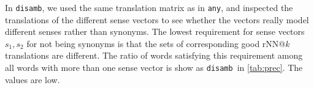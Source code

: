 \documentclass[11pt]{article}
\newcommand{\any}{\texttt{any}}
\newcommand{\disamb}{\texttt{disamb}}
\begin{document}
In \disamb, we used the same translation matrix as in \any, and inspected the
translations of the different sense vectors to see whether the vectors really
model different senses rather than synonyms.
The lowest requirement for sense vectors $s_1, s_2$ for not being synonyms is
that the sets of corresponding good rNN@$k$ translations are different. The
ratio of words satisfying this requirement among all words with more than one
sense vector is show as \disamb~in \cref{tab:prec}. The values are low.

\newcommand{\e}{$^E$}
\newcommand{\id}{$^I$}
\newcommand{\s}{$^S$}
\end{document}
